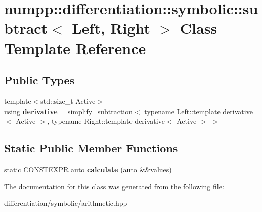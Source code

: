 \hypertarget{classnumpp_1_1differentiation_1_1symbolic_1_1subtract}{}\section{numpp\+:\+:differentiation\+:\+:symbolic\+:\+:subtract$<$ Left, Right $>$ Class Template Reference}
\label{classnumpp_1_1differentiation_1_1symbolic_1_1subtract}
\subsection*{Public Types}
\begin{DoxyCompactItemize}
\item 
\mbox{\label{classnumpp_1_1differentiation_1_1symbolic_1_1subtract_a0bbc9f66e45fca3760329e5825ae697f}} 
{\footnotesize template$<$std\+::size\+\_\+t Active$>$ }\\using {\bfseries derivative} = simplify\+\_\+subtraction$<$ typename Left\+::template derivative$<$ Active $>$, typename Right\+::template derivative$<$ Active $>$ $>$
\end{DoxyCompactItemize}
\subsection*{Static Public Member Functions}
\begin{DoxyCompactItemize}
\item 
\mbox{\label{classnumpp_1_1differentiation_1_1symbolic_1_1subtract_a0f9fa9511197ae0bf3a4ee4888e92a86}} 
static C\+O\+N\+S\+T\+E\+X\+PR auto {\bfseries calculate} (auto \&\&values)
\end{DoxyCompactItemize}


The documentation for this class was generated from the following file\+:\begin{DoxyCompactItemize}
\item 
differentiation/symbolic/arithmetic.\+hpp\end{DoxyCompactItemize}
